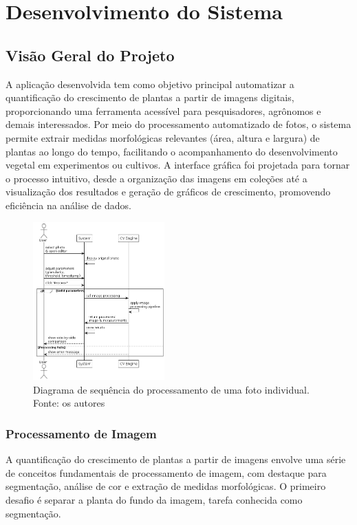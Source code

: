 \chapter{Desenvolvimento do Sistema}

\section{Visão Geral do Projeto}

A aplicação desenvolvida tem como objetivo principal automatizar a quantificação do crescimento de plantas a partir de imagens digitais, proporcionando uma ferramenta acessível para pesquisadores, agrônomos e demais interessados. Por meio do processamento automatizado de fotos, o sistema permite extrair medidas morfológicas relevantes (área, altura e largura) de plantas ao longo do tempo, facilitando o acompanhamento do desenvolvimento vegetal em experimentos ou cultivos. A interface gráfica foi projetada para tornar o processo intuitivo, desde a organização das imagens em coleções até a visualização dos resultados e geração de gráficos de crescimento, promovendo eficiência na análise de dados.

\begin{figure}[H]
    \centering
    \includegraphics[width=0.45\textwidth]{../figures/dss/UC011.png}
    \caption{Diagrama de sequência do processamento de uma foto individual. Fonte: os autores}
    \label{fig:uc011-process-single-photo}
\end{figure}

\subsection{Processamento de Imagem}

A quantificação do crescimento de plantas a partir de imagens envolve uma série de conceitos fundamentais de processamento de imagem, com destaque para segmentação, análise de cor e extração de medidas morfológicas. O primeiro desafio é separar a planta do fundo da imagem, tarefa conhecida como segmentação.

